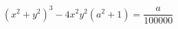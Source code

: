 \documentclass[preview]{standalone}
\begin{document}
\begin{align*}
(x^2 + y^2)^3 - 4x^2y^2(a^2 + 1) = \dfrac{a}{100000}
\end{align*}
\end{document}
